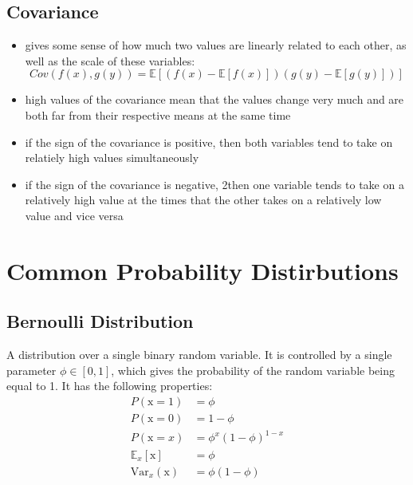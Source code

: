 \documentclass[11pt, twocolumn]{report}
\def\expectation{\mathbb{E}}
\begin{document}
\subsection{Covariance}
\begin{itemize}
  \item gives some sense of how much two values are linearly related to each
    other, as well as the scale of these variables:
    \begin{equation}
      Cov(f(x),g(y)) = \expectation{[(f(x) - \expectation{[f(x)]})(g(y) -
        \expectation{[g(y)]})]}
    \end{equation}
  \item high values of the covariance mean that the values change very much and
    are both far from their respective means at the same time
  \item if the sign of the covariance is positive, then both variables tend to
    take on relatiely high values simultaneously
  \item if the sign of the covariance is negative, 2then one variable tends to
    take on a relatively high value at the times that the other takes on a
    relatively low value and vice versa
\end{itemize}

\section{Common Probability Distirbutions}

\subsection{Bernoulli Distribution}
A distribution over a single binary random variable. It is controlled by a
single parameter $\phi \in [0, 1]$, which gives the probability of the random
variable being equal to 1. It has the following properties:
\begin{align}
  P(\text{x} = 1) &= \phi\\
  P(\text{x} = 0) &= 1 - \phi\\
  P(\text{x} = x) &= \phi^x(1 - \phi)^{1 - x}\\
  \expectation{}_x[\text{x}] &= \phi\\
  \text{Var}_x(\text{x}) &= \phi(1 - \phi)
\end{align}
\end{document}
